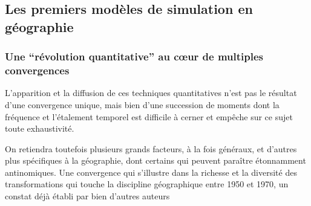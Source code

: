 



\subsection{Les premiers modèles de simulation en géographie}
\label{sec:premier_modele_geo}

\subsubsection{Une \enquote{révolution quantitative} au cœur de multiples convergences}
\label{ssec:revol_quanti}

L'apparition et la diffusion de ces techniques quantitatives n'est pas le résultat d'une convergence unique, mais bien d'une succession de moments dont la fréquence et l'étalement temporel est difficile à cerner et empêche sur ce sujet toute exhaustivité. 

On retiendra toutefois plusieurs grands facteurs, à la fois généraux, et d'autres plus spécifiques à la géographie, dont certains qui peuvent paraître étonnamment antinomiques. Une convergence qui s'illustre dans la richesse et la diversité des transformations qui touche la discipline géographique entre 1950 et 1970, un constat déjà établi par bien d'autres auteurs \autocite{Varenne2014}

